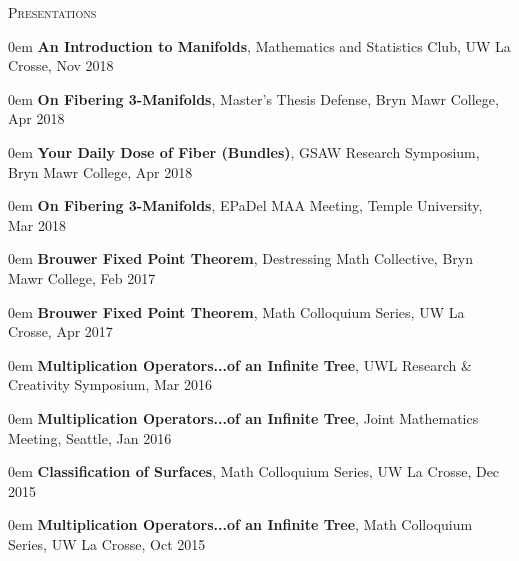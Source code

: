 \documentclass[11pt]{article}
\renewenvironment{section}[1]{\textsc{\large #1}}{\vskip10pt}
\newcommand{\itemreg}[1]{\begin{addmargin}[.75em]{0em} #1 \end{addmargin}}
\begin{document}
\begin{section}{Presentations}\vskip5pt 
	\itemreg{\textbf{An Introduction to Manifolds}, Mathematics and Statistics Club, UW La Crosse, Nov 2018} \vskip2pt
	\itemreg{\textbf{On Fibering 3-Manifolds}, Master's Thesis Defense, Bryn Mawr College, Apr 2018} \vskip2pt
	\itemreg{\textbf{Your Daily Dose of Fiber (Bundles)}, GSAW Research Symposium, Bryn Mawr College, Apr 2018} \vskip2pt
	\itemreg{\textbf{On Fibering 3-Manifolds}, EPaDel MAA Meeting, Temple University, Mar 2018} \vskip2pt
	\itemreg{\textbf{Brouwer Fixed Point Theorem}, Destressing Math Collective, Bryn Mawr College, Feb 2017} \vskip2pt
	\itemreg{\textbf{Brouwer Fixed Point Theorem}, Math Colloquium Series, UW La Crosse, Apr 2017} \vskip2pt
	\itemreg{\textbf{Multiplication Operators...of an Infinite Tree}, UWL Research \& Creativity Symposium, Mar 2016} \vskip2pt
	\itemreg{\textbf{Multiplication Operators...of an Infinite Tree}, Joint Mathematics Meeting, Seattle, Jan 2016} \vskip2pt
	\itemreg{\textbf{Classification of Surfaces}, Math Colloquium Series, UW La Crosse, Dec 2015} \vskip2pt
	\itemreg{\textbf{Multiplication Operators...of an Infinite Tree}, Math Colloquium Series, UW La Crosse, Oct 2015} \vskip2pt
\end{section}
\end{document}
